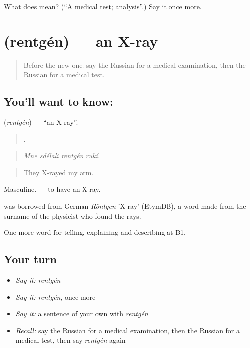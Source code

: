 \begin{tcolorbox}[breakable,colback=teal!4,colframe=teal!35!black,title={Before you move on}]
What does  mean? (\textquotedblleft{}A medical test; analysis\textquotedblright{}.) Say it once more.
\end{tcolorbox}
\section[\texorpdfstring{\ru{рентген} (rentgén)}{рентген (rentgén)}]{ (rentgén) — an X-ray}

\label{lesson:RU-C489-rentgen}



\begin{quote}
Before the new one: say the Russian for a medical examination, then the Russian for a medical test.
\end{quote}

\subsection*{You'll want to know: }
\textbf{} (\emph{rentgén}) — \textquotedblleft{}an X-ray\textquotedblright{}.

\begin{quote}
   .
\end{quote}

\begin{quote}
\emph{Mne sdélali rentgén rukí.}
\end{quote}

\begin{quote}
They X-rayed my arm.
\end{quote}

Masculine. \emph{ } — to have an X-ray.

\begin{cousinweb}
\emph{} was borrowed from German \emph{Röntgen} 'X-ray' (EtymDB), a word made from the surname of the physicist who found the rays.
\end{cousinweb}

\begin{grammarlens}[title={What you've built}]
One more word for telling, explaining and describing at B1.
\end{grammarlens}

\subsection*{Your turn}
\begin{itemize}
\raggedright
  \item \emph{Say it:} \emph{rentgén}
  \item \emph{Say it:} \emph{rentgén}, once more
  \item \emph{Say it:} a sentence of your own with \emph{rentgén}
  \item \emph{Recall:} say the Russian for a medical examination, then the Russian for a medical test, then say \emph{rentgén} again
\end{itemize}

